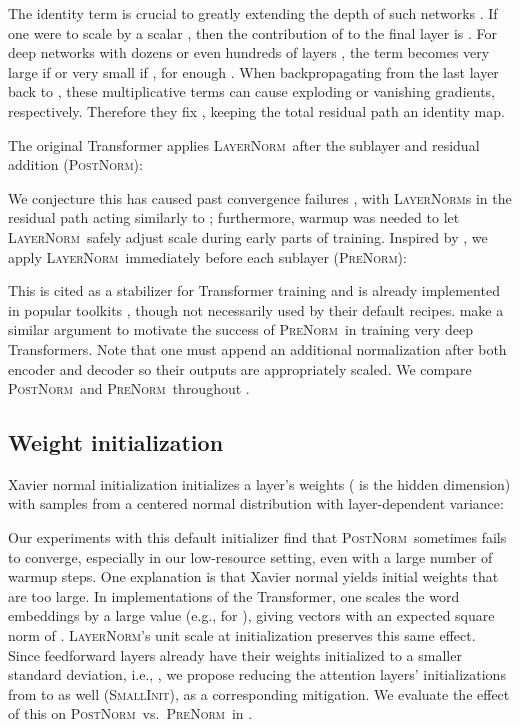 \documentclass[11pt,a4paper]{article}
\newcommand{\LNorm}{\textsc{LayerNorm}}
\newcommand{\PreNorm}{\textsc{PreNorm}}
\newcommand{\PostNorm}{\textsc{PostNorm}}
\newcommand{\SmallInit}{\textsc{SmallInit}}
\begin{document}
The identity term  is crucial to greatly extending the depth of such networks \cite{He2016-identity-mappings}. If one were to scale  by a scalar , then the contribution of  to the final layer  is . For deep networks with dozens or even hundreds of layers , the term  becomes very large if  or very small if , for enough . When backpropagating from the last layer  back to , these multiplicative terms can cause exploding or vanishing gradients, respectively. Therefore they fix , keeping the total residual path an identity map.

The original Transformer applies \LNorm\ after the sublayer and residual addition (\PostNorm):  

We conjecture this has caused past convergence failures \cite{Popel2018, Shazeer2018}, with {\LNorm}s in the residual path acting similarly to ; furthermore, warmup was needed to let \LNorm\ safely adjust scale during early parts of training. Inspired by \citet{He2016-identity-mappings}, we apply \LNorm\ immediately before each sublayer (\PreNorm): 
  
This is cited as a stabilizer for Transformer training \cite{Chen2018, Wang2019-learning-deep-transformers} and is already implemented in popular toolkits \cite{tensor2tensor, fairseq, sockeye}, though not necessarily used by their default recipes. \citet{Wang2019-learning-deep-transformers} make a similar argument to motivate the success of \PreNorm\ in training very deep Transformers. Note that one must append an additional normalization after both encoder and decoder so their outputs are appropriately scaled. We compare \PostNorm\ and \PreNorm\ throughout .

\subsection{Weight initialization}
\label{ssec:weight-init}

Xavier normal initialization \cite{Glorot2010} initializes a layer's weights  ( is the hidden dimension) with samples from a centered normal distribution with layer-dependent variance:

Our experiments with this default initializer find that \PostNorm\ sometimes fails to converge, especially in our low-resource setting, even with a large number of warmup steps. One explanation is that Xavier normal yields initial weights that are too large. In implementations of the Transformer, one scales the word embeddings by a large value (e.g.,  for ), giving vectors with an expected square norm of . \LNorm's unit scale at initialization preserves this same effect. Since feedforward layers already have their weights initialized to a smaller standard deviation, i.e., , we propose reducing the attention layers' initializations from  to  as well (\SmallInit), as a corresponding mitigation. We evaluate the effect of this on \PostNorm\ vs.\ \PreNorm\ in .
\end{document}
